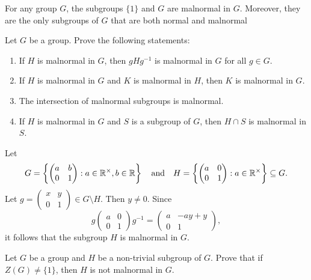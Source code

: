 For any group $G$, the subgroups $\{1\}$ and $G$ are malnormal in $G$. Moreover, they are the only subgroups of $G$ that are both normal and malnormal

\begin{exercise}
    Let $G$ be a group. Prove the following statements:
    \begin{enumerate}

        \item If $H$ is malnormal in $G$, then
        $gHg^{-1}$ is malnormal in $G$ for all $g\in G$. 
        \item If $H$ is malnormal in $G$ and 
        $K$ is malnormal in $H$, then $K$ is malnormal
        in $G$. 
        \item The intersection of malnormal
        subgroups is malnormal.
        \item If $H$ is malnormal in $G$ and 
        $S$ is a subgroup of $G$, then 
        $H\cap S$ is malnormal in $S$. 
        
    \end{enumerate}
\end{exercise}

\begin{example}
    Let 
    \[
    G=\left\{\begin{pmatrix}a&b\\0&1\end{pmatrix}:a\in\mathbb{R}^{\times},b\in\mathbb{R}\right\}\quad\text{and}\quad 
    H=\left\{\begin{pmatrix}a&0\\0&1\end{pmatrix}:a\in\mathbb{R}^{\times}\right\}\subseteq G. 
    \]
    Let $g=\begin{pmatrix}x&y\\0&1\end{pmatrix}\in G\setminus H$. Then $y\ne 0$. Since  
    \[
    g\begin{pmatrix}a&0\\0&1\end{pmatrix}g^{-1}
    =\begin{pmatrix}a&-ay+y\\0&1\end{pmatrix},
    \]
    it follows that the subgroup $H$ 
    is malnormal in $G$. 
\end{example}

\begin{exercise}
\label{xca:malnormal_center}
    Let $G$ be a group and $H$ be a non-trivial
    subgroup of $G$. Prove that if $Z(G)\ne\{1\}$, then
    $H$ is not malnormal in $G$. 
\end{exercise}


